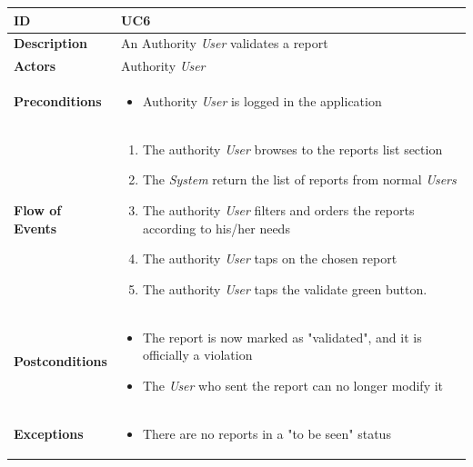 \begin{table}[H]
\begin{tabular}{|l|p{}|}
\hline
\textbf{ID}             & UC6                                                                             \\ \hline
\textbf{Description}    & An Authority \textit{User} validates a report \\ \hline
\textbf{Actors}         &  Authority \textit{User}                                                                       \\ \hline

\textbf{Preconditions}  &   \begin{itemize}

 \item Authority \textit{User} is logged in the application
                 \end{itemize}     
                    \\ \hline
                    
\textbf{Flow of Events} &   \begin{enumerate}
    \item The authority \textit{User} browses to the reports list section
    \item The \textit{System} return the list of reports from normal \textit{Users}
    \item The authority \textit{User} filters and orders the reports according to his/her needs
    \item The authority \textit{User} taps on the chosen report
    \item The authority \textit{User} taps the validate green button.

\end{enumerate}                                                                             \\ \hline
\textbf{Postconditions} & \begin{itemize}
     
 \item The report is now marked as "validated", and it is officially a violation
 \item The \textit{User} who sent the report can no longer modify it 
 \end{itemize}\\ \hline

\textbf{Exceptions} &    \begin{itemize}
    \item There are no reports in a "to be seen" status
   

\end{itemize}
  
                           \\ \hline

\end{tabular}
\end{table}




